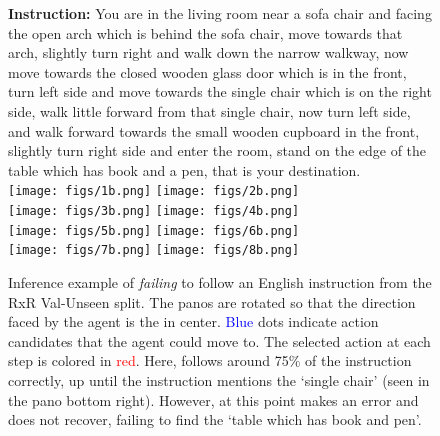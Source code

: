 \begin{figure*}[h]
  \centering
  \textbf{Instruction:} You are in the living room near a sofa chair and facing the open arch which is behind the sofa chair, move towards that arch, slightly turn right and walk down the narrow walkway, now move towards the closed wooden glass door which is in the front, turn left side and move towards the single chair which is on the right side, walk little forward from that single chair, now turn left side, and walk forward towards the small wooden cupboard in the front, slightly turn right side and enter the room, stand on the edge of the table which has book and a pen, that is your destination.
  \vspace{1mm}\\
  \texttt{[image: figs/1b.png]}
  \texttt{[image: figs/2b.png]} \vspace{2mm}\\
  \texttt{[image: figs/3b.png]}
  \texttt{[image: figs/4b.png]} \vspace{2mm}\\
  \texttt{[image: figs/5b.png]}
  \texttt{[image: figs/6b.png]} \vspace{2mm}\\
  \texttt{[image: figs/7b.png]}
  \texttt{[image: figs/8b.png]}
  \caption{Inference example of \ModelName{} \textit{failing} to follow an English instruction from the RxR Val-Unseen split.
   The panos are rotated so that the direction faced by the agent is the in center. \textcolor{blue}{Blue} dots indicate action candidates that the agent could move to. The selected action at each step is colored in \textcolor{red}{red}. Here, \ModelName{} follows around 75\% of the instruction correctly, up until the instruction mentions the `single chair' (seen in the pano bottom right). However, at this point \ModelName{} makes an error and does not recover, failing to find the `table which has book and pen'. }
  \label{fig:example3}
\end{figure*}
